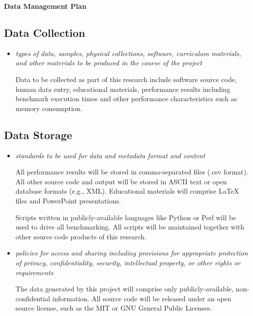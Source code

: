\begin{center}
        {\large\bf\textsf{
            Data Management Plan}}
\end{center}


\subsection*{Data Collection}

\begin{itemize}
\item \emph{types of data, samples, physical collections, software, curriculum materials, and other materials to be produced in the course of the project}

Data to be collected as part of this research include software source
code, human data entry, educational materials, performance results
including benchmark execution times and other performance
characteristics such as memory consumption.

\end{itemize}


\subsection*{Data Storage}

\begin{itemize}
\item \emph{standards to be used for data and metadata format and content}

All performance results will be stored in comma-separated files (.csv
format). All other source code and output will be stored in ASCII text
or open database formats (e.g., XML). Educational materials will
comprise LaTeX files and PowerPoint presentations.

Scripts written in publicly-available languages like Python or Perl
will be used to drive all benchmarking. All scripts will be maintained
together with other source code products of this research.

\item \emph{policies for access and sharing including provisions for appropriate protection of privacy, confidentiality, security, intellectual property, or other rights or requirements}

The data generated by this project will comprise only
publicly-available, non-confidential information. All source code will
be released under an open source license, such as the MIT or GNU General
Public Licenses.

\end{itemize}


